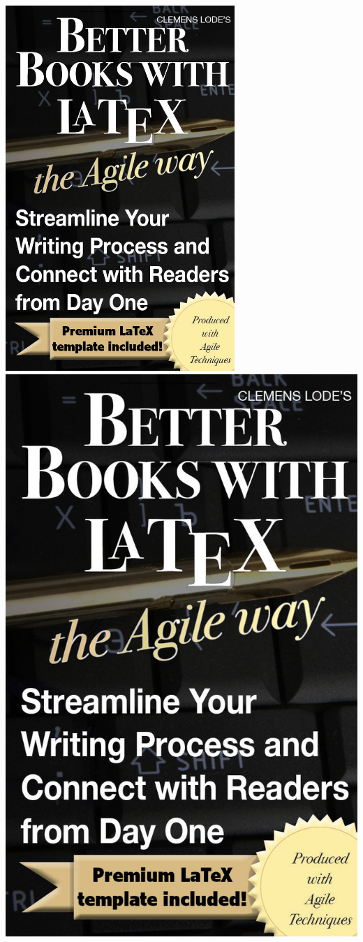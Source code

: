\begin{center}
    \ifxetex
		\includegraphics[width=0.65\textwidth]{images/ebookLatex_Cover_highres.png}
	\else
    	\includegraphics{images/ebookLatex_Cover.jpg}
    \fi
  \end{center}


\newpage